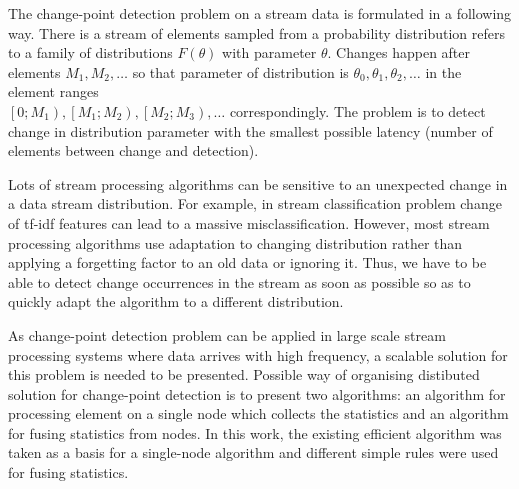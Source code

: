 The change-point detection problem on a stream data is formulated in a following way. There is a stream of elements sampled from a probability distribution refers to a family of distributions $F(\theta)$ with parameter $\theta$. Changes happen after elements $M_1, M_2, \dots$ so that parameter of distribution is $\theta_0, \theta_1, \theta_2, \dots$ in the element ranges \\ $\left[ 0; M_1 \right), \left[ M_1; M_2 \right), \left[M_2; M_3 \right), \dots$ correspondingly. The problem is to detect change in distribution parameter with the smallest possible latency (number of elements between change and detection).

Lots of stream processing algorithms can be sensitive to an unexpected change in a data stream distribution. For example, in stream classification problem change of tf-idf features can lead to a massive misclassification. However, most stream processing algorithms use adaptation to changing distribution rather than applying a forgetting factor to an old data or ignoring it. Thus, we have to be able to detect change occurrences in the stream as soon as possible so as to quickly adapt the algorithm to a different distribution.

As change-point detection problem can be applied in large scale stream processing systems where data arrives with high frequency, a scalable solution for this problem is needed to be presented. Possible way of organising distibuted solution for change-point detection is to present two algorithms: an algorithm for processing element on a single node which collects the statistics and an algorithm for fusing statistics from nodes. In this work, the existing efficient algorithm was taken as a basis for a single-node algorithm and different simple rules were used for fusing statistics. 
